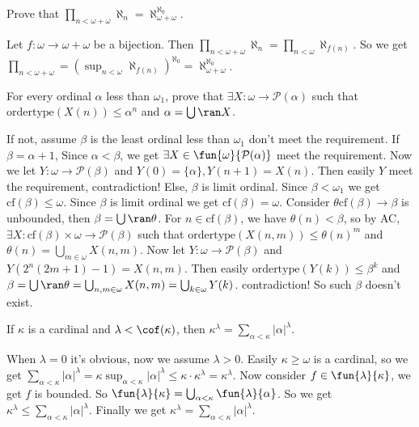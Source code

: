 \documentclass{ctexart}
\begin{document}
\begin{problem}
  Prove that \(\prod_{n<\omega+\omega} \aleph_n=\aleph_{\omega+\omega}^{\aleph_0}\).
\end{problem}

\begin{solution}
  Let \(f:\omega \to \omega+\omega\) be a bijection. Then \(\prod_{n<\omega + \omega} \aleph_n=\prod_{n<\omega} \aleph_{f(n)}\). 
  So we get \(\prod_{n<\omega+\omega} = \left(\sup_{n<\omega}\aleph_{f(n)}\right)^{\aleph_0}=\aleph_{\omega+\omega}^{\aleph_0}\). 
\end{solution}

\begin{problem}
  For every ordinal \(\alpha\) less than \(\omega_1\), prove that \(\exists X:\omega \to \mathcal{P}(\alpha)\) such that \(\text{ordertype}(X(n))\leq \alpha^n\) and \(\alpha=\bigcup \ran X \). 
\end{problem}

\begin{solution}
  If not, assume \(\beta\) is the least ordinal less than \(\omega_1\) don't meet the requirement. 
  If \(\beta=\alpha+1\), Since \(\alpha<\beta\), we get \(\exists X \in \fun{\omega}{\mathcal{P}(\alpha)}\) meet the requirement. 
  Now we let \(Y:\omega \to \mathcal{P}(\beta)\) and \(Y(0)=\{\alpha\},Y(n+1)=X(n)\). 
  Then easily \(Y\) meet the requirement, contradiction! 
  Else, \(\beta\) is limit ordinal. Since \(\beta<\omega_1\) we get \(\text{cf}(\beta)\leq \omega\). 
  Since \(\beta\) is limit ordinal we get \(\text{cf}(\beta)=\omega\). 
  Consider \(\theta \text{cf}(\beta) \to \beta\) is unbounded, then \(\beta=\bigcup \ran \theta \). 
  For \(n \in \text{cf}(\beta)\), we have \(\theta(n)<\beta\), so by AC, \(\exists X:\text{cf}(\beta) \times \omega \to \mathcal{P}(\beta)\) such that
  \(\text{ordertype}(X(n,m)) \leq \theta(n)^m\) and \(\theta(n) = \bigcup_{m \in \omega} X(n,m) \). 
  Now let \(Y:\omega \to \mathcal{P}(\beta)\) and \(Y(2^n(2m+1)-1)=X(n,m)\). 
  Then easily \(\text{ordertype}(Y(k)) \leq \beta^k\) and \(\beta=\bigcup \ran \theta=\bigcup_{n,m \in \omega} X(n,m)=\bigcup_{k \in \omega} Y(k) \). 
  contradiction! 
  So such \(\beta\) doesn't exist. 
\end{solution}
\begin{problem}
  If \(\kappa\) is a cardinal and \(\lambda < \cof(\kappa)\), then \(\kappa^\lambda=\sum_{\alpha<\kappa} |\alpha|^\lambda\). 
\end{problem}

\begin{solution}
  When \(\lambda=0\) it's obvious, now we assume \(\lambda>0\). 
  Easily \(\kappa \geq \omega\) is a cardinal, so we get \(\sum_{\alpha<\kappa} |\alpha|^\lambda=\kappa \sup_{\alpha<\kappa} |\alpha|^\lambda \leq \kappa \cdot \kappa^\lambda=\kappa^\lambda\). 
  Now consider \(f \in \fun{\lambda}{\kappa}\), we get \(f\) is bounded. So \(\fun{\lambda}{\kappa}=\bigcup_{\alpha<\kappa} \fun{\lambda}{\alpha}\). 
  So we get \(\kappa^{\lambda}\leq \sum_{\alpha<\kappa} |\alpha|^\lambda\). 
  Finally we get \(\kappa^\lambda=\sum_{\alpha<\kappa} |\alpha|^\lambda\).  
\end{solution}
\end{document}
